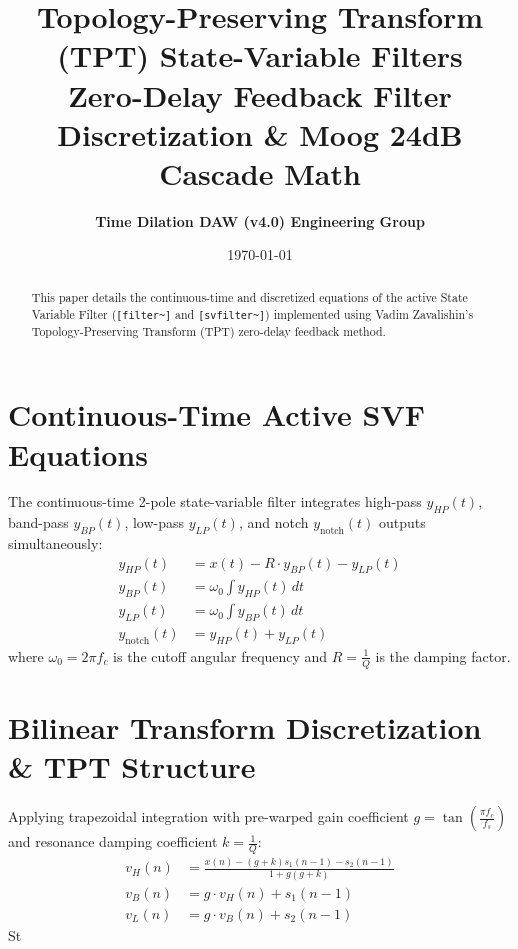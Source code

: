 \documentclass[11pt,a4paper]{article}
\title{\textbf{\Huge Topology-Preserving Transform (TPT) State-Variable Filters}\\[0.5em]
\Large Zero-Delay Feedback Filter Discretization \& Moog 24dB Cascade Math}
\author{\textbf{Time Dilation DAW (v4.0) Engineering Group}}
\date{\today}
\begin{document}
\maketitle

\begin{abstract}
This paper details the continuous-time and discretized equations of the active State Variable Filter (\texttt{[filter\textasciitilde{}]} and \texttt{[svfilter\textasciitilde{}]}) implemented using Vadim Zavalishin's Topology-Preserving Transform (TPT) zero-delay feedback method.
\end{abstract}

\section{Continuous-Time Active SVF Equations}
The continuous-time 2-pole state-variable filter integrates high-pass $y_{HP}(t)$, band-pass $y_{BP}(t)$, low-pass $y_{LP}(t)$, and notch $y_{\text{notch}}(t)$ outputs simultaneously:
\begin{align}
y_{HP}(t) &= x(t) - R \cdot y_{BP}(t) - y_{LP}(t) \\
y_{BP}(t) &= \omega_0 \int y_{HP}(t) \, dt \\
y_{LP}(t) &= \omega_0 \int y_{BP}(t) \, dt \\
y_{\text{notch}}(t) &= y_{HP}(t) + y_{LP}(t)
\end{align}
where $\omega_0 = 2\pi f_c$ is the cutoff angular frequency and $R = \frac{1}{Q}$ is the damping factor.

\section{Bilinear Transform Discretization \& TPT Structure}
Applying trapezoidal integration with pre-warped gain coefficient $g = \tan\left(\frac{\pi f_c}{f_s}\right)$ and resonance damping coefficient $k = \frac{1}{Q}$:
\begin{align}
v_H(n) &= \frac{x(n) - (g + k) s_1(n-1) - s_2(n-1)}{1 + g(g + k)} \\
v_B(n) &= g \cdot v_H(n) + s_1(n-1) \\
v_L(n) &= g \cdot v_B(n) + s_2(n-1)
\end{align}
St
\end{document}
